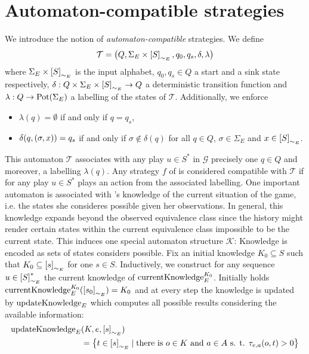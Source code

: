 \section{Automaton-compatible strategies}
We introduce the notion of \emph{automaton-compatible} strategies. We define
\begin{equation*}
  \mathcal{T} = \left(Q, \Sigma_{E}\times \left[S\right]_{\sim_{E}}, q_{0}, 
  q_{s}, \delta, \lambda\right)
\end{equation*}
where $\Sigma_{E}\times \left[S\right]_{\sim_{E}}$ is the input alphabet, 
$q_{0}, q_{s}\in Q$ a start and a sink state respectively, 
$\delta:Q\times \Sigma_{E}\times \left[S\right]_{\sim_{E}}\rightarrow Q$ a 
deterministic transition function and $\lambda:Q\rightarrow\operatorname{Pot}(\Sigma_{E})$ a
labelling of the states of $\mathcal{T}$. Additionally, we enforce
\begin{itemize}
  \item $\lambda(q) = \emptyset$ if and only if $q = q_{s}$,
  \item $\delta(q, \left(\sigma, x\right)) = q_{s}$ if and only if 
    $\sigma\not\in\delta(q)$ for all $q\in Q$, $\sigma\in\Sigma_{E}$ and 
    $x\in\left[S\right]_{\sim_{E}}$.
\end{itemize}
This automaton $\mathcal{T}$ associates with any play $u\in S^{*}$ in 
$\mathcal{G}$ precisely one $q\in Q$ and moreover, a labelling $\lambda(q)$. 
Any strategy $f$ of \eve{} is considered compatible with $\mathcal{T}$ if for 
any play $u\in S^{*}$ \eve{} plays an action from the associated labelling. One
important automaton is associated with \eve{}'s knowledge of the current 
situation of the game, i.e. the states she consideres possible given her 
observations. In general, this knowledge expands beyond the observed 
equivalence class since the history might render certain states within the 
current equivalence class impossible to be the current state.
This induces one special automaton structure $\mathcal{K}$: Knowledge is 
encoded as sets of states \eve{} considers possible. Fix an initial knowledge 
$K_{0}\subseteq S$ such that $K_{0}\subseteq\left[s\right]_{\sim_{E}}$ for one 
$s\in S$. Inductively, we construct for any sequence 
$u\in \left[S\right]_{\sim_{E}}^{*}$ the current knowledge of \eve{} 
$\operatorname{currentKnowledge}^{K_{0}}_{E}$. Initially holds 
$\operatorname{currentKnowledge}^{K_{0}}_{E}(\left[s_{0}\right]_{\sim_{E}}) = K_{0}$ 
and at every step the knowledge is updated by $\operatorname{updateKnowledge}_{E}$ which computes all
possible results considering the available information: 
\begin{align*}
  \operatorname{updateKnowledge}_{E}&(K, e, \left[s\right]_{\sim_{E}})\\
  &= \left\{
    t\in\left[s\right]_{\sim_{E}}\mid \text{there is }o\in K\text{ and }a\in A
    \text{ s. t. }\tau_{e,a}(o, t) > 0
  \right\}
\end{align*}
